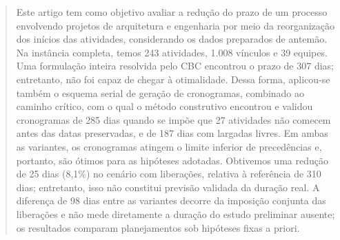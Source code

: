 
\begin{abstract}
Este artigo tem como objetivo avaliar a redução do prazo de um processo envolvendo projetos de arquitetura e engenharia por meio da reorganização dos inícios das atividades, considerando os dados preparados de antemão. Na instância completa, temos 243 atividades, 1.008 vínculos e 39 equipes. Uma formulação inteira resolvida pelo CBC encontrou o prazo de 307 dias; entretanto, não foi capaz de chegar à otimalidade. Dessa forma, aplicou-se também o esquema serial de geração de cronogramas, combinado ao caminho crítico, com o qual o método construtivo encontrou e validou cronogramas de 285 dias quando se impõe que 27 atividades não comecem antes das datas preservadas, e de 187 dias com largadas livres. Em ambas as variantes, os cronogramas atingem o limite inferior de precedências e, portanto, são ótimos para as hipóteses adotadas. Obtivemos uma redução de 25 dias (8,1\%) no cenário com liberações, relativa à referência de 310 dias; entretanto, isso não constitui previsão validada da duração real. A diferença de 98 dias entre as variantes decorre da imposição conjunta das liberações e não mede diretamente a duração do estudo preliminar ausente; os resultados comparam planejamentos sob hipóteses fixas a priori.
\end{abstract}

